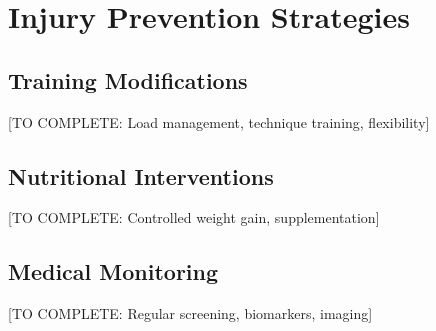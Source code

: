 \section{Injury Prevention Strategies}

\subsection{Training Modifications}

[TO COMPLETE: Load management, technique training, flexibility]

\subsection{Nutritional Interventions}

[TO COMPLETE: Controlled weight gain, supplementation]

\subsection{Medical Monitoring}

[TO COMPLETE: Regular screening, biomarkers, imaging]